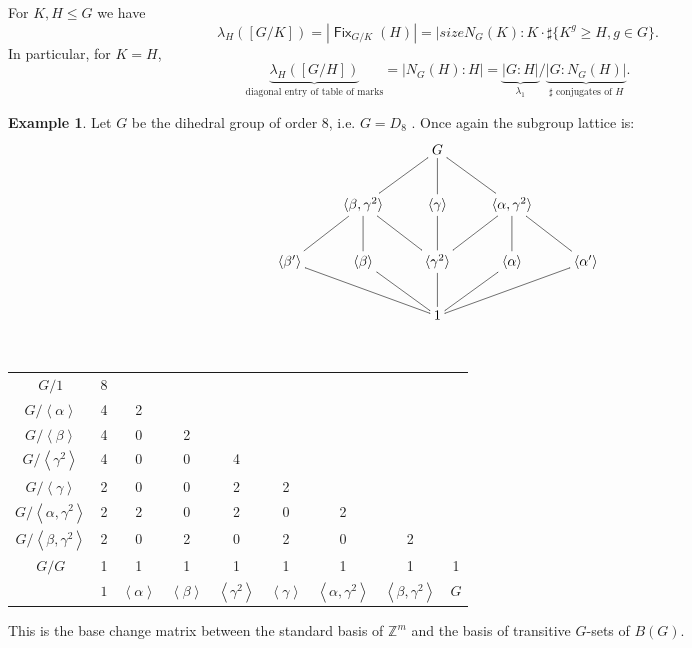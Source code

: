 \documentclass[12pt]{amsart}
\theoremstyle{definition}
\newtheorem{example}[theorem]{Example}
\DeclareMathOperator{\Fix}{\mathsf{Fix}}
\newcommand{\Size}[1]{\left| #1 \right|}
\begin{document}
For $K, H\leq G$ we have
$$\lambda_H([G/K])=\Size{\Fix_{G/K}(H)}=|size{N_G(K):K}\cdot\sharp\{K^g\geq H, g\in G\}.$$
In particular, for $K=H$,
$$\underbrace{\lambda_H([G/H])}_{\textrm{diagonal entry of table of marks}}=\Size{N_G(H):H}=\underbrace{\Size{G:H}}_{\lambda_1}/\underbrace{\Size{G:N_G(H)}}_{\sharp\textrm{ conjugates of }H}.$$

\begin{example}
Let $G$ be the dihedral group of order 8, i.e. $G = D_{8}$ . Once again the subgroup lattice is:
$$\xymatrix{&& G \ar@{-}[dl] \ar@{-}[d] \ar@{-}[dr]\\
& \langle\beta,\gamma^2\rangle \ar@{-}[dl] \ar@{-}[d] \ar@{-}[dr] & \langle\gamma\rangle \ar@{-}[d] & \langle\alpha,\gamma^2\rangle \ar@{-}[dl] \ar@{-}[d] \ar@{-}[dr] \\
\langle\beta'\rangle \ar@{-}[drr] & \langle\beta\rangle \ar@{-}[dr] & \langle\gamma^2\rangle \ar@{-}[d] & \langle\alpha\rangle \ar@{-}[dl] & \langle\alpha'\rangle \ar@{-}[dll] \\
&& 1}$$

\begin{table*}[h]
    \centering\
    \begin{tabular}{|c | c  c  c  c  c  c  c  c |}
    \hline
    $G/ 1$ & 8 & &  & & & & & \\
    $G / \left\langle \alpha \right\rangle$ & 4 & 2& & & & & & \\
    $G / \left\langle \beta \right\rangle$  & 4 & 0 & 2 & & & & & \\
    $G / \left\langle \gamma^{2} \right\rangle$ & 4 & 0 & 0 & 4 & & & & \\
    $G / \left\langle \gamma \right\rangle$ & 2 & 0 & 0 & 2 & 2 & & & \\
    $G / \left\langle \alpha, \gamma^{2} \right\rangle$ & 2 & 2 & 0 & 2& 0 & 2 & & \\
    $G / \left\langle \beta, \gamma^{2} \right\rangle$ & 2 & 0 & 2 & 0 & 2 & 0 & 2 & \\
    $G / G$ & 1 & 1 & 1 & 1 & 1 & 1 & 1 & 1\\
    \hline
    $ $ & $1$ & $ \left\langle \alpha \right\rangle$ & $\left\langle \beta \right\rangle$ & $\left\langle \gamma^{2} \right\rangle$ & $\left\langle \gamma \right\rangle$ & $\left\langle \alpha, \gamma^{2} \right\rangle$ & $\left\langle \beta, \gamma^{2} \right\rangle$ & $G$\\[1ex]
    \hline
    \end{tabular}
\end{table*}

This is the base change matrix between the standard basis of $\mathbb{Z}^{m}$ and the basis of transitive $G$-sets of $B(G)$.
\end{example}
\end{document}
